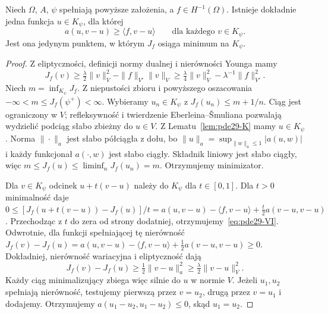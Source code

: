 \begin{twierdzenie}
\label{thm:pde29-existence}
Niech $\Omega$, $A$, $\psi$ spełniają powyższe założenia,
a $f\in H^{-1}(\Omega)$. Istnieje dokładnie jedna funkcja
$u\in K_\psi$, dla której
\begin{equation}\label{eq:pde29-VI}
 a(u,v-u)\ge\langle f,v-u\rangle
 \qquad\text{dla każdego }v\in K_\psi.
\end{equation}
Jest ona jedynym punktem, w którym $J_f$ osiąga minimum na $K_\psi$.
\end{twierdzenie}
\begin{proof}
Z eliptyczności, definicji normy dualnej
i nierówności Younga mamy
\[
 J_f(v)\ge\tfrac\lambda2\|v\|_V^2-\|f\|_{V'}\|v\|_V
 \ge\tfrac\lambda4\|v\|_V^2-\lambda^{-1}\|f\|_{V'}^2.
\]
Niech $m=\inf_{K_\psi}J_f$. Z niepustości zbioru
i powyższego oszacowania $-\infty<m\le J_f(\psi^+)<\infty$.
Wybieramy $u_n\in K_\psi$ z $J_f(u_n)\le m+1/n$.
Ciąg jest ograniczony w $V$; refleksywność i twierdzenie
Eberleina--Šmuliana pozwalają wydzielić podciąg
słabo zbieżny do $u\in V$.
Z Lematu~\ref{lem:pde29-K} mamy $u\in K_\psi$.
Norma $\|\cdot\|_a$ jest słabo półciągła z dołu,
bo $\|u\|_a=\sup_{\|w\|_a\le1}|a(u,w)|$
i każdy funkcjonał $a(\cdot,w)$ jest słabo ciągły.
Składnik liniowy jest słabo ciągły, więc
$m\le J_f(u)\le\liminf_n J_f(u_n)=m$.
Otrzymujemy minimizator.

Dla $v\in K_\psi$ odcinek $u+t(v-u)$ należy do $K_\psi$
dla $t\in[0,1]$. Dla $t>0$ minimalność daje
$0\le[J_f(u+t(v-u))-J_f(u)]/t
 =a(u,v-u)-\langle f,v-u\rangle+
 \frac t2a(v-u,v-u)$. Przechodząc z $t$ do zera od strony dodatniej,
otrzymujemy~\eqref{eq:pde29-VI}. Odwrotnie, dla funkcji
spełniającej tę nierówność
$J_f(v)-J_f(u)=a(u,v-u)-\langle f,v-u\rangle
+\frac12a(v-u,v-u)\ge0$.
Dokładniej, nierówność wariacyjna i eliptyczność dają
\[
 J_f(v)-J_f(u)\ge\tfrac12\|v-u\|_a^2
 \ge\tfrac\lambda2\|v-u\|_V^2.
\]
Każdy ciąg minimalizujący zbiega więc silnie do $u$
w normie $V$.
Jeżeli $u_1,u_2$ spełniają nierówność, testujemy pierwszą przez
$v=u_2$, drugą przez $v=u_1$ i dodajemy. Otrzymujemy
$a(u_1-u_2,u_1-u_2)\le0$, skąd $u_1=u_2$.
\end{proof}


